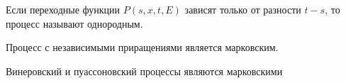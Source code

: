 \begin{definition}
    Если переходные функции $P(s, x, t, E)$ зависят только от разности $t - s$, то процесс называют однородным.
\end{definition}

\begin{theorem}
    Процесс с независимыми приращениями является марковским.
\end{theorem}

\begin{corollary}
    Винеровский и пуассоновский процессы являются марковскими
\end{corollary}